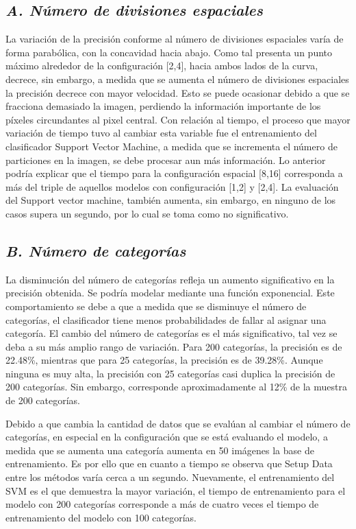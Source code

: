 \documentclass[10pt,twocolumn,letterpaper]{article}
\begin{document}
\subsection{ \textit{A. Número de divisiones espaciales}}
La variación de la precisión conforme al número de divisiones espaciales varía de forma parabólica, con la concavidad hacia abajo. Como tal presenta un punto máximo alrededor de la configuración [2,4], hacia ambos lados de la curva, decrece, sin embargo, a medida que se aumenta el número de divisiones espaciales la precisión decrece con mayor velocidad. Esto se puede ocasionar debido a que se fracciona demasiado la imagen, perdiendo la información importante de los píxeles circundantes al pixel central. 
Con relación al tiempo, el proceso que mayor variación de tiempo tuvo al cambiar esta variable fue el entrenamiento del clasificador Support Vector Machine, a medida que se incrementa el número de particiones en la imagen, se debe procesar aun más información. Lo anterior podría explicar que el tiempo para la configuración espacial [8,16] corresponda a más del triple de aquellos modelos con configuración [1,2] y [2,4]. La evaluación del Support vector machine, también aumenta, sin embargo, en ninguno de los casos supera un segundo, por lo cual se toma como no significativo. 

\subsection{ \textit{B. Número de categorías}}
La disminución del número de categorías refleja un aumento significativo en la precisión obtenida. Se podría modelar mediante una función exponencial. Este comportamiento se debe a que a medida que se disminuye el número de categorías, el clasificador tiene menos probabilidades de fallar al asignar una categoría. El cambio del número de categorías es el más significativo, tal vez se deba a su más amplio rango de variación. Para 200 categorías, la precisión es de 22.48\%, mientras que para 25 categorías, la precisión es de 39.28\%. Aunque ninguna es muy alta, la precisión con 25 categorías casi duplica la precisión de 200 categorías. Sin embargo, corresponde aproximadamente al 12\% de la muestra de 200 categorías. 

Debido a que cambia la cantidad de datos que se evalúan al cambiar el número de categorías, en especial en la configuración que se está evaluando el modelo, a medida que se aumenta una categoría aumenta en 50 imágenes la base de entrenamiento. Es por ello que en cuanto a tiempo se observa que Setup Data entre los métodos varía cerca a un segundo. Nuevamente, el entrenamiento del SVM es el que demuestra la mayor variación, el tiempo de entrenamiento para el modelo con 200 categorías corresponde a más de cuatro veces el tiempo de entrenamiento del modelo con 100 categorías.
 
\end{document}
